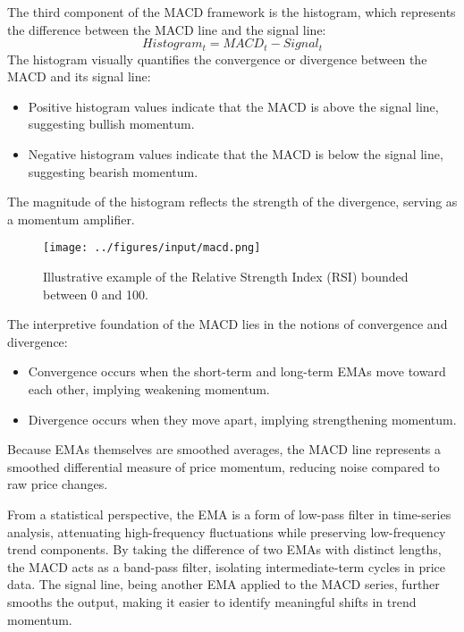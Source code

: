 The third component of the MACD framework is the histogram, which represents the difference between the MACD line and the signal line:
\[
Histogram_t = MACD_t - Signal_t
\]
The histogram visually quantifies the convergence or divergence between the MACD and its signal line:
\begin{itemize}
    \item Positive histogram values indicate that the MACD is above the signal line, suggesting bullish momentum.
    \item Negative histogram values indicate that the MACD is below the signal line, suggesting bearish momentum.
\end{itemize}
The magnitude of the histogram reflects the strength of the divergence, serving as a momentum amplifier.

\begin{figure}[H]
    \centering
    \texttt{[image: ../figures/input/macd.png]}
    \caption{Illustrative example of the Relative Strength Index (RSI) bounded between 0 and 100.}
\end{figure}

The interpretive foundation of the MACD lies in the notions of convergence and divergence:
\begin{itemize}
    \item Convergence occurs when the short-term and long-term EMAs move toward each other, implying weakening momentum.
    \item Divergence occurs when they move apart, implying strengthening momentum.
\end{itemize}
Because EMAs themselves are smoothed averages, the MACD line represents a smoothed differential measure of price momentum, reducing noise compared to raw price changes.

From a statistical perspective, the EMA is a form of low-pass filter in time-series analysis, attenuating high-frequency fluctuations while preserving low-frequency trend components. By taking the difference of two EMAs with distinct lengths, the MACD acts as a band-pass filter, isolating intermediate-term cycles in price data. The signal line, being another EMA applied to the MACD series, further smooths the output, making it easier to identify meaningful shifts in trend momentum.

